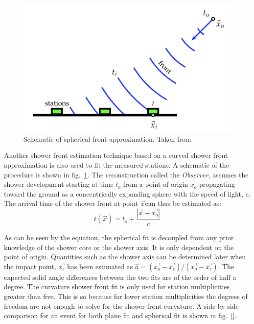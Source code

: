 \begin{figure}[h!]
  \centering
  \includegraphics[width=\textwidth]{thesis_figures/Nu_analysis/Spherical_fit.png}
  \caption{Schematic of spherical-front approximation. Taken from~\cite{PierreAuger:2020yab}}
  \label{fig:Spherical_fit}
\end{figure}

Another shower front estimation technique based on a curved shower front approximation is also used to fit the measured stations. A schematic of the procedure is shown in fig.~\ref{fig:Spherical_fit}. The reconstruction called the \textit{Observer}, assumes the shower development starting at time $t_o$ from a point of origin $x_o$ propagating toward the ground as a concentrically expanding sphere with the speed of light, $c$. The arrival time of the shower front at point $\vec{x}$can thus be estimated as:
\begin{equation}
  t(\vec{x}) = t_o + \frac{|\vec{x}-\vec{x_o}|}{c}
\end{equation}

As can be seen by the equation, the spherical fit is decoupled from any prior knowledge of the shower core or the shower axis. It is only dependent on the point of origin. Quantities such as the shower axis can be determined later when the impact point, $\vec{x_c}$ has been estimated as $ \hat{a} = (\vec{x_o} -\vec{x_c})/ (\vec{x_o}-\vec{x_c})$. The expected solid angle differences between the two fits are of the order of half a degree. The curvature shower front fit is only used for station multiplicities greater than five. This is so because for lower station multiplicities the degrees of freedom are not enough to solve for the shower-front curvature. A side by side comparison for an event for both plane fit and spherical fit is shown in fig.~\ref{}.

